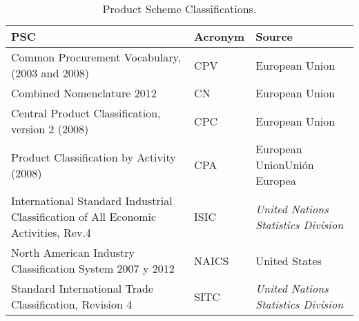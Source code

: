 \documentclass[preprint,12pt]{elsarticle}
\begin{document}
\begin{table}[!ht]
\renewcommand{\arraystretch}{1.3}
\begin{center}
\begin{tabular}[c]{|p{6cm}|l|p{6cm}|} 
\hline
  \textbf{PSC} &  \textbf{Acronym} & \textbf{Source} \\\hline
  Common Procurement Vocabulary, (2003 and 2008) & CPV & European Union \\ \hline
  Combined Nomenclature 2012 & CN & European Union \\ \hline
  Central Product Classification, version 2 (2008) & CPC & European Union \\ \hline
  Product Classification by Activity (2008) & CPA & European UnionUnión Europea \\ \hline
  International Standard Industrial Classification of All Economic Activities, Rev.4 & ISIC & \textit{United Nations Statistics Division} \\ \hline
  North American Industry Classification System 2007 y 2012 & NAICS & United States \\ \hline
  Standard International Trade Classification, Revision 4 & SITC & \textit{United Nations Statistics Division} \\ \hline
\hline
\end{tabular}
\caption{Product Scheme Classifications.}\label{table:pscs-ld}
  \end{center}
\end{table} 
\end{document}
